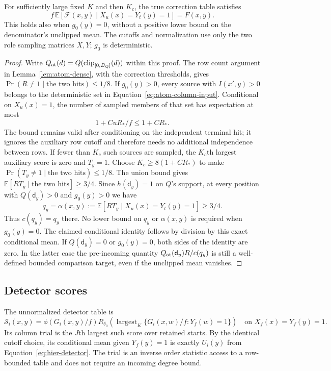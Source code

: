 \begin{lemma}
\label{lem:atom-correction}
For sufficiently large fixed $K$ and then $K_c$, the true correction
table satisfies
\[
 f\,\mathbb E[\mathcal F(x,y)\mid X_u(x)=Y_t(y)=1]=F(x,y).
\]
This holds also when $g_0(y)=0$, without a positive lower bound on
the denominator's unclipped mean. The cutoffs and normalization use only
the two role sampling matrices $X,Y$; $g_0$ is deterministic.
\end{lemma}

\begin{proof}
Write $Q_{\rm at}(d)=Q(\operatorname{clip}_{[0,B_Q]}(d))$ within this
proof. The row count argument in Lemma~\ref{lem:atom-dense}, with the correction
thresholds, gives $\Pr(R\ne1\mid\text{the two hits})\le1/8$.
If $g_0(y)>0$, every source with $I(x',y)>0$ belongs to the deterministic
set in Equation~\eqref{eq:atom-column-input}.  Conditional on $X_u(x)=1$,
the number of sampled members of that set has expectation at most
\[
 1+C uR_*/f\le1+C R_*.
\]
The bound remains valid after conditioning on the independent terminal
hit; it ignores the auxiliary row cutoff and therefore needs no additional
independence between rows.  If fewer than $K_c$ such sources are sampled,
the $K_c$th largest auxiliary score is zero and $T_y=1$.  Choose
$K_c\ge8(1+C R_*)$ to make $\Pr(T_y\ne1\mid\text{the two hits})\le1/8$.
The union bound gives
$\mathbb E[RT_y\mid\text{the two hits}]\ge3/4$.
Since $h(\mathsf{d}_y)=1$ on $Q$'s support, at every position with
$Q(\mathsf{d}_y)>0$ and $g_0(y)>0$ we have
\begin{equation}
 q_y=\alpha(x,y):=
 \mathbb E[RT_y\mid X_u(x)=Y_t(y)=1]\ge3/4.
 \label{eq:atom-alpha-bound}
\end{equation}
Thus $c(q_y)=q_y$ there. No lower bound on $q_y$ or $\alpha(x,y)$
is required when $g_0(y)=0$.  The claimed conditional
identity follows by division by this exact conditional mean.  If
$Q(\mathsf{d}_y)=0$ or $g_0(y)=0$, both sides of the identity are zero.  In the latter
case the pre-incoming quantity $Q_{\rm at}(\mathsf{d}_y)R/c(q_y)$ is still a well-defined
bounded comparison target, even if the unclipped mean vanishes.
\end{proof}

\subsection{Detector scores}

The unnormalized detector table is
\begin{equation}
 \mathcal S_i(x,y)=\phi(G_i(x,y)/f)
 R_{\delta_0}\!\left(\operatorname{largest}_K
       \{G_i(x,w)/f:Y_f(w)=1\}\right)
 \quad\text{on }X_f(x)=Y_f(y)=1.
 \label{eq:atom-detector-table}
\end{equation}
Its column trial is the $J$th largest such score over retained starts.
By the identical cutoff choice, its conditional mean given $Y_f(y)=1$
is exactly $U_i(y)$ from Equation~\eqref{eq:hier-detector}.
The trial is an inverse order statistic access to a row-bounded table and does not
require an incoming degree bound.

